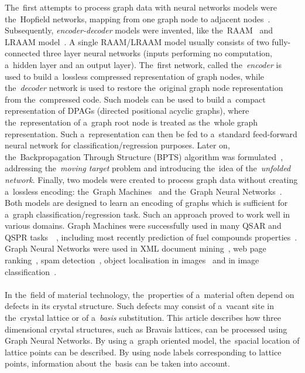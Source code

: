 \documentclass{llncs}
\begin{document}
The~first attempts to process graph data with neural networks models were the~Hopfield networks, mapping from one graph node to adjacent nodes~\cite{goulon2005hopfield}. Subsequently, \emph{encoder-decoder} models were invented, like the~RAAM~\cite{pollack1990recursive} and LRAAM model~\cite{sperduti1994labelling}. A single RAAM/LRAAM model usually consists of two fully-connected three layer neural networks (inputs performing no computation, a~hidden layer and an output layer). The~first network, called the~\emph{encoder} is used to build a~lossless compressed representation of graph nodes, while the~\emph{decoder} network is used to restore the~original graph node representation from the~compressed code. Such models can be used to build a~compact representation of DPAGs (directed positional acyclic graphs), where the~representation of a~graph root node is treated as the~whole graph representation. Such a~representation can then be fed to a~standard feed-forward neural network for classification/regression purposes. Later on, the~Backpropagation Through Structure (BPTS) algorithm was formulated~\cite{goller1996learning}, addressing the~\emph{moving target} problem and introducing the~idea of the~\emph{unfolded network}. Finally, two models were created to process graph data without creating a~lossless encoding: the~Graph Machines~\cite{goulon2005learning} and the~Graph Neural Networks~\cite{scarselli2009graph}. Both models are designed to learn an encoding of graphs which is sufficient for a~graph classification/regression task. Such an approach proved to work well in various domains. Graph Machines were successfully used in many QSAR and QSPR tasks~\cite{goulon2007predicting}~\cite{goulon2011novel}, including most recently prediction of fuel compounds properties~\cite{saldana2013rational}. Graph Neural Networks were used in XML document mining~\cite{yong2006xml}, web page ranking~\cite{scarselli2005graph}, spam detection~\cite{scarselli2013solving}, object localisation in images~\cite{monfardini2006graph} and in image classification~\cite{quek2011structural}.
\\\\
In the~field of material technology, the~properties of a~material often depend on defects in its crystal structure. Such defects may consist of a~vacant site in the~crystal lattice or of a~\emph{basis} substitution.
This article describes how three dimensional crystal structures, such as Bravais lattices, can be processed using Graph Neural Networks. By using a~graph oriented model, the~spacial location of lattice points can be described. By using node labels corresponding to lattice points, information about the~basis can be taken into account.
\end{document}
